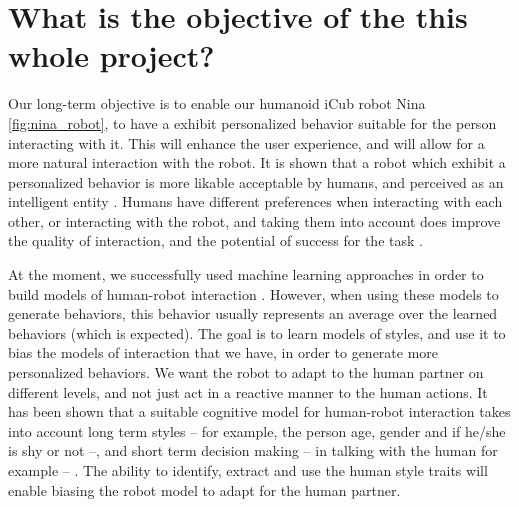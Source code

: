 \section{What is the objective of the this whole project?}
\par Our long-term objective is to enable our humanoid iCub robot Nina \ref{fig:nina_robot}, to have a exhibit personalized behavior suitable for the person interacting with it. This will enhance the user experience, and will allow for a more natural interaction with the robot. It is shown that a robot which exhibit a personalized behavior is more likable acceptable by humans, and perceived as an intelligent entity \citep{churamani2017impact}. Humans have different preferences when interacting with each other, or interacting with the robot, and taking them into account does improve the quality of interaction, and the potential of success for the task \citep{kashi2018smooth}.

\par At the moment, we successfully used machine learning approaches in order to build models of human-robot interaction \citep{mihoub2016graphical,bailly:hal-01939223,nguyen:hal-01609535}. However, when using these models to generate behaviors, this behavior usually represents an average over the learned behaviors (which is expected). The goal is to learn models of styles, and use it to bias the models of interaction that we have, in order to generate more personalized behaviors. We want the robot to adapt to the human partner on different levels, and not just act in a reactive manner to the human actions. It has been shown that a suitable cognitive model for human-robot interaction takes into account long term styles -- for example, the person age, gender and if he/she is shy or not --, and short term decision making -- in talking with the human for example -- \citep{thorisson2002natural,bailly2010gaze}. The ability to identify, extract and use the human style traits will enable biasing the robot model to adapt for the human partner.

